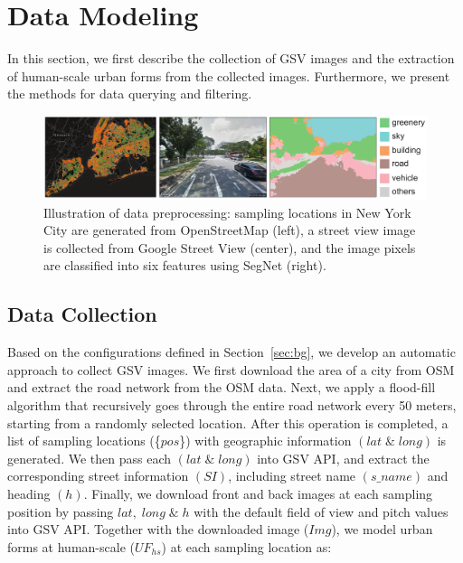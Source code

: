 \section{Data Modeling}
In this section, we first describe the collection of GSV images and the extraction of human-scale urban forms from the collected images.
Furthermore, we present the methods for data querying and filtering.

\begin{figure}[t]
	\centering
	\includegraphics[width=\columnwidth]{figure/streetvizor/fig3_data_preprocess/data_process}
	\vspace{-7mm}
	\caption{Illustration of data preprocessing: sampling locations in New York City are generated from OpenStreetMap (left), a street view image is collected from Google Street View (center), and the image pixels are classified into six features using SegNet (right).}
	\label{fig:data_preprocess}
	\vspace{-4mm}
\end{figure}

\subsection{Data Collection}
\label{ssec:data_collection}

Based on the configurations defined in Section~\ref{sec:bg}, we develop an automatic approach to collect GSV images.
We first download the area of a city from OSM~\cite{osm_api} and extract the road network from the OSM data.
Next, we apply a flood-fill algorithm that recursively goes through the entire road network every 50 meters, starting from a randomly selected location.
After this operation is completed, a list of sampling locations (\{$pos$\}) with geographic information $(lat \; \& \; long)$ is generated.
We then pass each $(lat \; \& \; long)$ into GSV API, and extract the corresponding street information $(SI)$, including street name $(s\_name)$ and heading $(h)$. 
Finally, we download front and back images at each sampling position by passing $lat, \; long \; \& \; h$ with the default field of view and pitch values into GSV API.
Together with the downloaded image ($Img$), we model urban forms at human-scale ($UF_{hs}$) at each sampling location as: 

